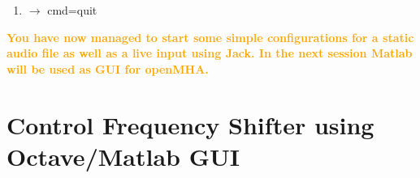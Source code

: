 \documentclass[11pt,a4paper,twoside]{article}
\newcommand{\+}{\discretionary{\mbox{\scriptsize$\hookleftarrow$}}{}{}}
\begin{document}
{{{\begin{enumerate}
OpenMHA is now applying a gain to your own voice input. In order to close openMHA type:
\item  $\rightarrow$ {\ttfamily cmd=quit}

\end{enumerate}

\textcolor{orange}{\textbf{You have now managed to start some simple configurations for a static audio file as well as a live input using Jack. In the next session Matlab will be used as GUI for openMHA.}}


\newpage

\section{Control Frequency Shifter using Octave/Matlab GUI}
\label{sec:freqshifter}




}}}
\end{document}
